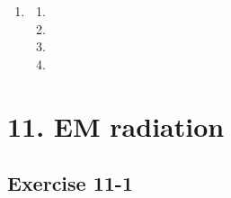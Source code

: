 \begin{enumerate}[itemsep=5pt, label=\textbf{\arabic*}. ]
\begin{enumerate}[noitemsep, label=\textbf{(\alph*)} ]
    \item %
    \item %
    \item %
    \end{enumerate}
\item %
    \begin{enumerate}[noitemsep, label=\textbf{(\alph*)} ]
    \item %
    \item %
    \item %
    \item %
    \end{enumerate}
  \end{enumerate}



\section {11. EM radiation}
\subsection{Exercise 11-1} %
       
